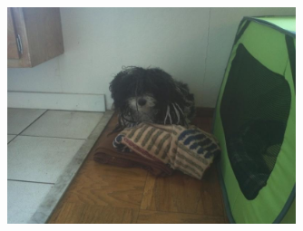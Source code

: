 \documentclass[aspectratio=1610,pdftex,dvipsnames,compress,xcolor={dvipsnames}]{beamer}
\begin{document}




\begin{frame}[plain]{}
    \begin{figure}
        \centering
        \includegraphics[width=0.75\textwidth]{final.jpg}
    \end{figure}
\end{frame}
\end{document}
